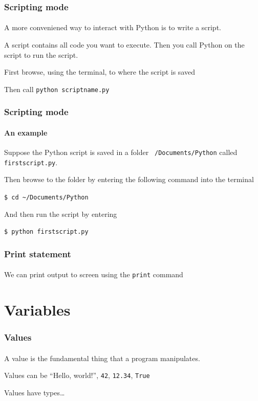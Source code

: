 \begin{frame}\frametitle{Scripting mode}
    \framesubtitle{}

    A more conveniened way to interact with Python is to write a script.

    \vfill

    A script contains all code you want to execute. Then you call Python on
    the script to run the script.

    \vfill

    First browse, using the terminal, to where the script is saved

    \vfill

    Then call \texttt{python scriptname.py}

\end{frame}

\begin{frame}[fragile]\frametitle{Scripting mode}
    \framesubtitle{An example}

    Suppose the Python script is saved in a folder \texttt{~/Documents/Python}
    called \texttt{firstscript.py}.

    \vfill

    Then browse to the folder by entering the following command into the terminal

    \vfill

    \verb|$ cd ~/Documents/Python|

    \vfill

    And then run the script by entering

    \vfill

    \verb|$ python firstscript.py|

\end{frame}

\begin{frame}\frametitle{Print statement}
    \framesubtitle{}

    We can print output to screen using the \texttt{print} command


\end{frame}


\section{Variables} %
\label{sec:variables}

\begin{frame}\frametitle{Values}
    \framesubtitle{}

    A value is the fundamental thing that a program manipulates.

    \vfill

    Values can be ``Hello, world!'', \texttt{42}, \texttt{12.34}, \texttt{True}

    \vfill

    Values have types\ldots

\end{frame}

